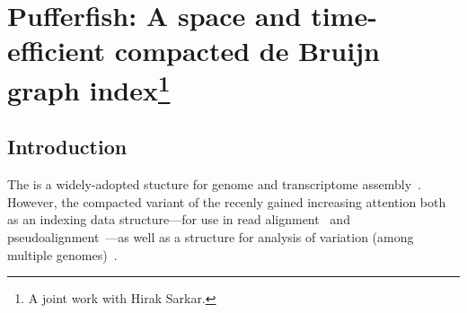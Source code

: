 \chapter{Pufferfish: A space and time-efficient compacted de Bruijn graph index\protect\footnote{A joint work with Hirak Sarkar.}}
\label{chap:pufferfish}


%
%
%
%
%

\section{Introduction}\label{sec:puffintro}

The \dbg is a widely-adopted stucture for genome and transcriptome
assembly~\cite{grabherr2011full,pevzner2001eulerian,haas2013novo}. However, the
compacted variant of the \dbg recenly gained increasing attention both as an indexing
data structure---for use in read alignment~\cite{liu2016debga} and
pseudoalignment~\cite{Bray2016Kallisto}---as well as a structure for analysis of
variation (among multiple genomes)~\cite{minkin2016twopaco}.


